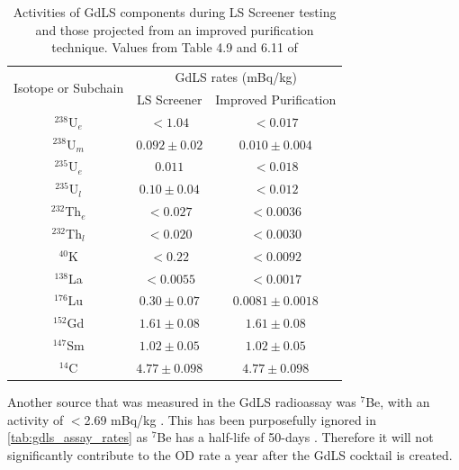 \begin{table}[]
    \centering
    \begin{tabular}{c|c|c}
        \multirow{2}{*}{Isotope or Subchain}  &  \multicolumn{2}{c}{GdLS rates (mBq/kg)}      \\ 
                             &  LS Screener          & Improved Purification \\ \hline
        ${}^{238}$U$_{e}$      &  $< 1.04$             & $< 0.017$             \\ 
        ${}^{238}$U$_{m}$      &  $0.092\pm0.02$       & $0.010\pm0.004$       \\
        ${}^{235}$U$_{e}$      &  $0.011$              & $< 0.018$             \\
        ${}^{235}$U$_{l}$      &  $0.10\pm0.04$        & $< 0.012$             \\
        ${}^{232}$Th$_{e}$     &  $< 0.027$            & $< 0.0036$            \\
        ${}^{232}$Th$_{l}$     &  $< 0.020$            & $< 0.0030$            \\
        ${}^{40}$K           &  $< 0.22$             & $< 0.0092$            \\
        ${}^{138}$La         &  $< 0.0055$           & $< 0.0017$            \\
        ${}^{176}$Lu         &  $0.30\pm0.07$        & $0.0081\pm0.0018$     \\
        ${}^{152}$Gd       &  $1.61\pm0.08$        & $1.61\pm0.08$         \\
        ${}^{147}$Sm       &  $1.02\pm0.05$        & $1.02\pm0.05$         \\
        ${}^{14}$C         &  $4.77\pm0.098$       & $4.77\pm0.098$ 
    \end{tabular}
    \caption{Activities of GdLS components during LS Screener testing and those projected from an improved purification technique. Values from Table 4.9 and 6.11 of \cite{scotthaselschwardt_thesis_ref}}
    \label{tab:gdls_assay_rates}
\end{table}
\par
Another source that was measured in the GdLS radioassay was ${}^{7}$Be, with an activity of $<$2.69 mBq/kg \cite{scotthaselschwardt_thesis_ref}.
This has been purposefully ignored in \autoref{tab:gdls_assay_rates} as ${}^{7}$Be has a half-life of 50-days \cite{be7_decay_ref}.
Therefore it will not significantly contribute to the OD rate a year after the GdLS cocktail is created.


